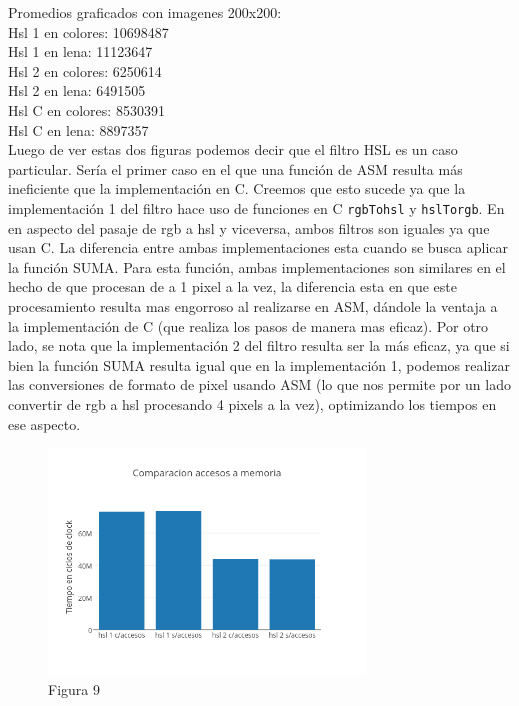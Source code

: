 \documentclass[a4paper]{article}
\begin{document}
Promedios graficados con imagenes 200x200:
\\

Hsl 1 en colores: 10698487
\\

Hsl 1 en lena: 11123647
\\

Hsl 2 en colores: 6250614
\\

Hsl 2 en lena: 6491505
\\

Hsl C en colores: 8530391
\\

Hsl C en lena: 8897357
\\

Luego de ver estas dos figuras podemos decir que el filtro HSL es un caso particular. Sería el primer caso en el que una función de ASM resulta más ineficiente que la implementación en C. Creemos que esto sucede ya que la implementación 1 del filtro hace uso de funciones en C {\tt rgbTohsl} y {\tt hslTorgb}. En en aspecto del pasaje de rgb a hsl y viceversa, ambos filtros son iguales ya que usan C. La diferencia entre ambas implementaciones esta cuando se busca aplicar la función SUMA. Para esta función, ambas implementaciones son similares en el hecho de que procesan de a 1 pixel a la vez, la diferencia esta en que este procesamiento resulta mas engorroso al realizarse en ASM, dándole la ventaja a la implementación de C (que realiza los pasos de manera mas eficaz).
Por otro lado, se nota que la implementación 2 del filtro resulta ser la más eficaz, ya que si bien la función SUMA resulta igual que en la implementación 1, podemos realizar las conversiones de formato de pixel usando ASM (lo que nos permite por un lado convertir de rgb a hsl procesando 4 pixels a la vez), optimizando los tiempos en ese aspecto.
 

\begin{figure}[h]
  \centering
    \includegraphics[width=0.75\textwidth]{imagenes/ComparacionAccesosAMemoriaHslColores.png}
  \caption{Figura 9}
  \label{fig:graficohsl3}
\end{figure}
 \FloatBarrier
\end{document}
